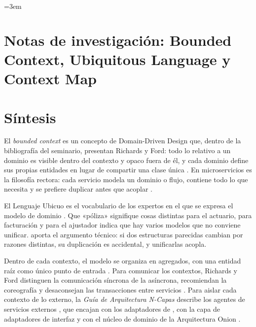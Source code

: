 
\begingroup\emergencystretch=3em 
\section*{Notas de investigación: Bounded Context, Ubiquitous Language y Context Map}

\section{Síntesis}

El \emph{bounded context} es un concepto de Domain-Driven Design que, dentro de la
bibliografía del seminario, presentan Richards y Ford: todo lo relativo a un dominio es
visible dentro del contexto y opaco fuera de él, y cada dominio define sus propias
entidades en lugar de compartir una clase única \parencite[cap.~7]{richardsford2020}. En
microservicios es la filosofía rectora: cada servicio modela un dominio o flujo, contiene
todo lo que necesita y se prefiere duplicar antes que acoplar
\parencite[cap.~17]{richardsford2020}.

El Lenguaje Ubicuo es el vocabulario de los expertos en el que se expresa el modelo de
dominio \parencite[21]{delatorre2010}. Que «póliza» signifique cosas distintas para el
actuario, para facturación y para el ajustador indica que hay varios modelos que no
conviene unificar. \textcite[154--155]{martin2017} aporta el argumento técnico: si dos
estructuras parecidas cambian por razones distintas, su duplicación es accidental, y
unificarlas acopla.

Dentro de cada contexto, el modelo se organiza en agregados, con una entidad raíz como
único punto de entrada \parencite[172]{delatorre2010}. Para comunicar los contextos,
Richards y Ford distinguen la comunicación síncrona de la asíncrona, recomiendan la
coreografía y desaconsejan las transacciones entre servicios
\parencite[cap.~17]{richardsford2020}. Para aislar cada contexto de lo externo, la
\emph{Guía de Arquitectura N-Capas} describe los agentes de servicios externos
\parencite[58, 108, 155--156]{delatorre2010}, que encajan con los adaptadores de
\textcite{cockburn2005}, con la capa de adaptadores de interfaz
\parencite[205]{martin2017} y con el núcleo de dominio de la Arquitectura Onion
\parencite{palermo2008}.

